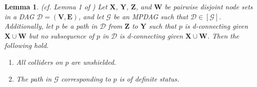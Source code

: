\documentclass[11pt]{article}
\newtheorem{lemma}[theorem]{Lemma}
\newcommand{\mb}[1]{\mathbf{#1}}
\newcommand{\g}[1][G]{\mathcal{#1}}
\begin{document}

\begin{lemma}
\label{lem:do-helper1}
{\normalfont (cf. Lemma 1 of \cite{zhang2006causal})}
    Let $\mb{X}$, $\mb{Y}$, $\mb{Z}$, and $\mb{W}$ be pairwise disjoint node sets in a DAG $\g[D]=(\mb{V,E})$, and let $\g$ be an MPDAG such that $\g[D] \in [\g]$. Additionally, let $p$ be a path in $\g[D]$ from $\mb{Z}$ to $\mb{Y}$ such that $p$ is d-connecting given $\mb{X} \cup \mb{W}$ but no subsequence of $p$ in $\g[D]$ is d-connecting given $\mb{X} \cup \mb{W}$. Then the following hold.
    \begin{enumerate}[label=(\roman*)]
        \item\label{lem:do-helper1-one}
        All colliders on $p$ are unshielded.
        
        \item\label{lem:do-helper1-two}
        The path in $\g$ corresponding to $p$ is of definite status.
    \end{enumerate}
\end{lemma}
\end{document}
